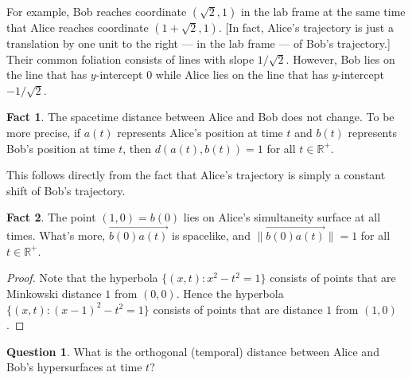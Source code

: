 \documentclass[tikz,border=10pt]{article}
\theoremstyle{definition}
\newtheorem*{question}{Question}
\newtheorem*{fact}{Fact}
\newcommand{\vecc}[1]{\overrightarrow{#1}}
\begin{document}
For example, Bob reaches coordinate $(\sqrt{2},1)$ in the lab frame at
the same time that Alice reaches coordinate $(1+\sqrt{2},1)$. [In
fact, Alice's trajectory is just a translation by one unit to the
right --- in the lab frame --- of Bob's trajectory.] Their common
foliation consists of lines with slope $1/\sqrt{2}$. However, Bob lies
on the line that has $y$-intercept $0$ while Alice lies on the line
that has $y$-intercept $-1/\sqrt{2}$.

\begin{fact} The spacetime distance between Alice and Bob does not
  change. To be more precise, if $a(t)$ represents Alice's position at
  time $t$ and $b(t)$ represents Bob's position at time $t$, then
  $d(a(t),b(t))=1$ for all $t\in\mathbb{R}^+$. \end{fact}

This follows directly from the fact that Alice's trajectory is simply
a constant shift of Bob's trajectory.

\begin{fact} The point $(1,0)=b(0)$ lies on Alice's simultaneity
  surface at all times. What's more, $\vecc{b(0)a(t)}$ is spacelike,
  and $\| \vecc{b(0)a(t)}\| =1$ for all $t\in\mathbb{R}^+$. \end{fact}

\begin{proof} Note that the hyperbola $\{ (x,t):x^2-t^2=1\}$ consists of points
  that are Minkowski distance $1$ from $(0,0)$. Hence the hyperbola
  $\{ (x,t):(x-1)^2-t^2=1\}$ consists of points that are distance $1$
  from $(1,0)$. 
\end{proof}


\begin{question} What is the orthogonal (temporal) distance between
  Alice and Bob's hypersurfaces at time $t$? \end{question}
  
\end{document}
